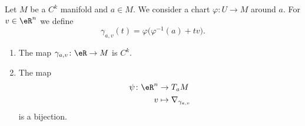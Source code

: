 \begin{proposition}
    Let \( M\) be a \( C^k\) manifold and \( a\in M\). We consider a chart \( \varphi\colon U\to M\) around \( a\). For \( v\in \eR^n\) we define
    \begin{equation}
        \gamma_{a,v}(t)=\varphi\big( \varphi^{-1}(a)+tv \big).
    \end{equation}
    \begin{enumerate}
        \item
            The map \( \gamma_{a,v}\colon \eR\to M\) is \( C^k\).
        \item
            The map
            \begin{equation}
                \begin{aligned}
                    \psi\colon \eR^n&\to T_aM \\
                    v&\mapsto \nabla_{\gamma_{a,v}} 
                \end{aligned}
            \end{equation}
            is a bijection.
    \end{enumerate}
\end{proposition}

